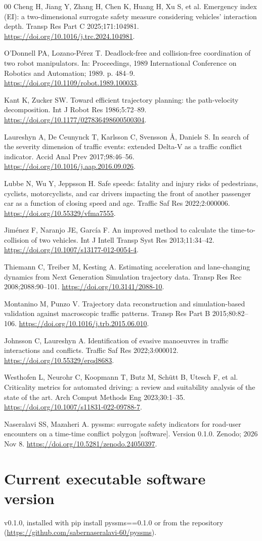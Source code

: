 \documentclass[preprint,12pt, a4paper]{elsarticle}
\begin{document}
\begin{thebibliography}{00}
 Cheng H, Jiang Y, Zhang H, Chen K, Huang H, Xu S, et al. Emergency index (EI): a two-dimensional surrogate safety measure considering vehicles' interaction depth. Transp Res Part C 2025;171:104981. \url{https://doi.org/10.1016/j.trc.2024.104981}.

 O'Donnell PA, Lozano-Pérez T. Deadlock-free and collision-free coordination of two robot manipulators. In: Proceedings, 1989 International Conference on Robotics and Automation; 1989. p. 484--9. \url{https://doi.org/10.1109/robot.1989.100033}.

 Kant K, Zucker SW. Toward efficient trajectory planning: the path-velocity decomposition. Int J Robot Res 1986;5:72--89. \url{https://doi.org/10.1177/027836498600500304}.

 Laureshyn A, De Ceunynck T, Karlsson C, Svensson Å, Daniels S. In search of the severity dimension of traffic events: extended Delta-V as a traffic conflict indicator. Accid Anal Prev 2017;98:46--56. \url{https://doi.org/10.1016/j.aap.2016.09.026}.

 Lubbe N, Wu Y, Jeppsson H. Safe speeds: fatality and injury risks of pedestrians, cyclists, motorcyclists, and car drivers impacting the front of another passenger car as a function of closing speed and age. Traffic Saf Res 2022;2:000006. \url{https://doi.org/10.55329/vfma7555}.

 Jiménez F, Naranjo JE, García F. An improved method to calculate the time-to-collision of two vehicles. Int J Intell Transp Syst Res 2013;11:34--42. \url{https://doi.org/10.1007/s13177-012-0054-4}.

 Thiemann C, Treiber M, Kesting A. Estimating acceleration and lane-changing dynamics from Next Generation Simulation trajectory data. Transp Res Rec 2008;2088:90--101. \url{https://doi.org/10.3141/2088-10}.

 Montanino M, Punzo V. Trajectory data reconstruction and simulation-based validation against macroscopic traffic patterns. Transp Res Part B 2015;80:82--106. \url{https://doi.org/10.1016/j.trb.2015.06.010}.

 Johnsson C, Laureshyn A. Identification of evasive manoeuvres in traffic interactions and conflicts. Traffic Saf Res 2022;3:000012. \url{https://doi.org/10.55329/erqd8683}.

 Westhofen L, Neurohr C, Koopmann T, Butz M, Schütt B, Utesch F, et al. Criticality metrics for automated driving: a review and suitability analysis of the state of the art. Arch Comput Methods Eng 2023;30:1--35. \url{https://doi.org/10.1007/s11831-022-09788-7}.

 Naseralavi SS, Mazaheri A. pyssms: surrogate safety indicators for road-user encounters on a time-time conflict polygon [software]. Version 0.1.0. Zenodo; 2026 Nov 8. \url{https://doi.org/10.5281/zenodo.24050397}.

\end{thebibliography}

\section*{Current executable software version}

v0.1.0, installed with pip install pyssms==0.1.0 or from the repository (\url{https://github.com/sabernaseralavi-60/pyssms}).
\end{document}
